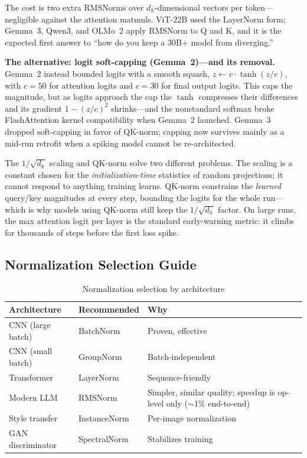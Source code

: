The cost is two extra RMSNorms over $d_h$-dimensional vectors per token---negligible against the attention matmuls. ViT-22B used the LayerNorm form; Gemma~3, Qwen3, and OLMo~2 apply RMSNorm to Q and K, and it is the expected first answer to ``how do you keep a 30B+ model from diverging.''

\textbf{The alternative: logit soft-capping (Gemma~2)---and its removal.} Gemma~2 instead bounded logits with a smooth squash, $z \leftarrow c \cdot \tanh(z/c)$, with $c = 50$ for attention logits and $c = 30$ for final output logits. This caps the magnitude, but as logits approach the cap the $\tanh$ compresses their differences and its gradient $1 - (z/c)^2$ shrinks---and the nonstandard softmax broke FlashAttention kernel compatibility when Gemma~2 launched. Gemma~3 dropped soft-capping in favor of QK-norm; capping now survives mainly as a mid-run retrofit when a spiking model cannot be re-architected.

\begin{keyinsight}
The $1/\sqrt{d_k}$ scaling and QK-norm solve two different problems. The scaling is a constant chosen for the \emph{initialization-time} statistics of random projections; it cannot respond to anything training learns. QK-norm constrains the \emph{learned} query/key magnitudes at every step, bounding the logits for the whole run---which is why models using QK-norm still keep the $1/\sqrt{d_h}$ factor. On large runs, the max attention logit per layer is the standard early-warning metric: it climbs for thousands of steps before the first loss spike.
\end{keyinsight}

\subsection{Normalization Selection Guide}

\begin{table}[H]
\centering
\caption{Normalization selection by architecture}
\begin{tabularx}{\textwidth}{lXX}
\toprule
\textbf{Architecture} & \textbf{Recommended} & \textbf{Why} \\
\midrule
CNN (large batch) & BatchNorm & Proven, effective \\
CNN (small batch) & GroupNorm & Batch-independent \\
Transformer & LayerNorm & Sequence-friendly \\
Modern LLM & RMSNorm & Simpler, similar quality; speedup is op-level only ($\sim$1\% end-to-end) \\
Style transfer & InstanceNorm & Per-image normalization \\
GAN discriminator & SpectralNorm & Stabilizes training \\
\bottomrule
\end{tabularx}
\end{table}

